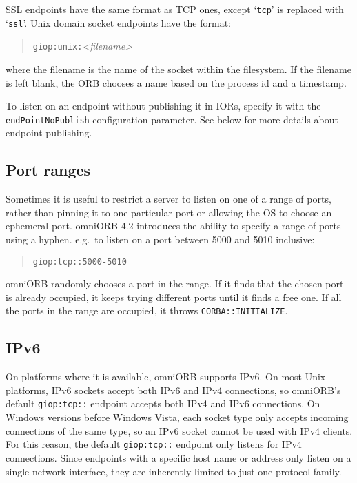 \documentclass[11pt,twoside,a4paper]{book}
\newcommand{\code}[1]{\texttt{#1}}
\begin{document}
SSL endpoints have the same format as TCP ones, except `\code{tcp}'
is replaced with `\code{ssl}'. Unix domain socket endpoints have the
format:

\begin{quote}
\code{giop:unix:}\textit{<filename>}
\end{quote}

\noindent where the filename is the name of the socket within the
filesystem. If the filename is left blank, the ORB chooses a name
based on the process id and a timestamp.

To listen on an endpoint without publishing it in IORs, specify it
with the \code{endPointNoPublish} configuration parameter. See below
for more details about endpoint publishing.


\subsection{Port ranges}

Sometimes it is useful to restrict a server to listen on one of a
range of ports, rather than pinning it to one particular port or
allowing the OS to choose an ephemeral port. omniORB 4.2 introduces
the ability to specify a range of ports using a hyphen. e.g.\ to
listen on a port between 5000 and 5010 inclusive:

\begin{quote}
\code{giop:tcp::5000-5010}
\end{quote}

omniORB randomly chooses a port in the range. If it finds that the
chosen port is already occupied, it keeps trying different ports until
it finds a free one. If all the ports in the range are occupied, it
throws \code{CORBA::INITIALIZE}.


\subsection{IPv6}

On platforms where it is available, omniORB supports IPv6. On most
Unix platforms, IPv6 sockets accept both IPv6 and IPv4 connections, so
omniORB's default \code{giop:tcp::} endpoint accepts both IPv4 and
IPv6 connections. On Windows versions before Windows Vista, each
socket type only accepts incoming connections of the same type, so an
IPv6 socket cannot be used with IPv4 clients. For this reason, the
default \code{giop:tcp::} endpoint only listens for IPv4 connections.
Since endpoints with a specific host name or address only listen on a
single network interface, they are inherently limited to just one
protocol family.
\end{document}
